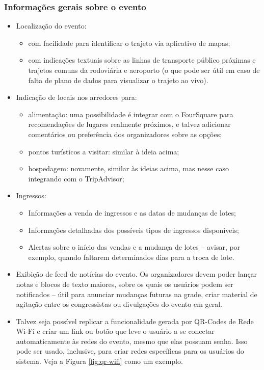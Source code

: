 \documentclass[a4paper]{abntex2}
\begin{document}
\subsubsection*{Informações gerais sobre o evento}
\begin{itemize}
	\item Localização do evento:
		\begin{itemize}
			\item com facilidade para identificar o trajeto via aplicativo de mapas;
			\item com indicações textuais sobre as linhas de transporte público próximas e trajetos comuns da rodoviária e aeroporto (o que pode ser útil em caso de falta de plano de dados para visualizar o trajeto ao vivo).
		\end{itemize}
	\item Indicação de locais nos arredores para:
		\begin{itemize}
			\item alimentação: uma possibilidade é integrar com o FourSquare para recomendações de lugares realmente próximos, e talvez adicionar comentários ou preferência dos organizadores sobre as opções;
			\item pontos turísticos a visitar: similar à ideia acima;
			\item hospedagem: novamente, similar às ideias acima, mas nesse caso integrando com o TripAdvisor;
		\end{itemize}
	\item Ingressos:
	\begin{itemize}
		\item Informações a venda de ingressos e as datas de mudanças de lotes;
		\item Informações detalhadas dos possíveis tipos de ingressos disponíveis;
		\item Alertas sobre o início das vendas e a mudança de lotes -- avisar, por exemplo, quando faltarem determinados dias para a troca de lote.
	\end{itemize}
	\item Exibição de feed de notícias do evento. Os organizadores devem poder lançar notas e blocos de texto maiores, sobre os quais os usuários podem ser notificados -- útil para anunciar mudanças futuras na grade, criar material de agitação entre os congressistas ou divulgações do evento em geral. 
	\item Talvez seja possível replicar a funcionalidade gerada por QR-Codes de Rede Wi-Fi e criar um link ou botão que leve o usuário a se conectar automaticamente às redes do evento, mesmo que elas possuam senha. Isso pode ser usado, inclusive, para criar redes específicas para os usuários do sistema. Veja a Figura \ref{fig:qr-wifi} como um exemplo.
\end{itemize}
\end{document}

